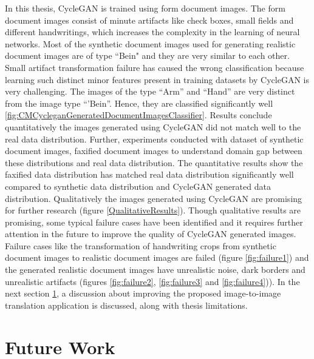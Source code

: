 In this thesis, \ac{CycleGAN} is trained using form document images. The form document images consist of minute artifacts like check boxes, small fields and different handwritings, which increases the complexity in the learning of neural networks. Most of the synthetic document images used for generating realistic document images are of type ``Bein" and they are very similar to each other. Small artifact transformation failure has caused the wrong classification because learning such distinct minor features present in training datasets by \ac{CycleGAN} is very challenging. The images of the type ``Arm'' and ``Hand'' are very distinct from the image type ``'Bein''. Hence, they are classified significantly well \ref{fig:CMCycleganGeneratedDocumentImagesClassifier}. Results conclude quantitatively the images generated using \ac{CycleGAN} did not match well to the real data distribution. Further, experiments conducted with dataset of synthetic document images, faxified document images to understand domain gap between these distributions and real data distribution. The quantitative results show the faxified data distribution has matched real data distribution significantly well compared to synthetic data distribution and \ac{CycleGAN} generated data distribution. Qualitatively the images generated using \ac{CycleGAN} are promising for further research (figure \ref{QualitativeResults}). Though qualitative results are promising, some typical failure cases have been identified and it requires further attention in the future to improve the quality of \ac{CycleGAN} generated images. Failure cases like the transformation of handwriting crops from synthetic document images to realistic document images are failed (figure \ref{fig:failure1}) and the generated realistic document images have unrealistic noise, dark borders and unrealistic artifacts (figures \ref{fig:failure2}, \ref{fig:failure3} and \ref{fig:failure4})). In the next section \ref{FutureWork}, a discussion about improving the proposed image-to-image translation application is discussed, along with thesis limitations.

\section{Future Work}\label{FutureWork}

